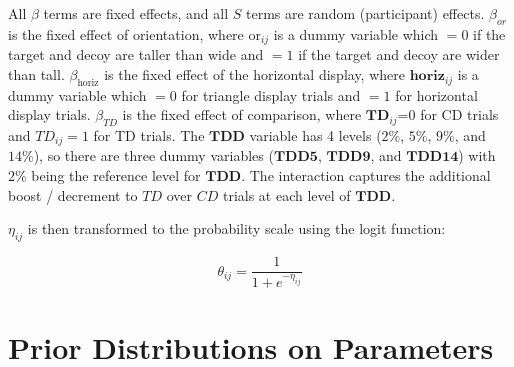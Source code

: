 All $\beta$ terms are fixed effects, and all $S$ terms are random (participant) effects. $\beta_{or}$ is the fixed effect of orientation, where $\text{or}_{ij}$ is a dummy variable which $=0$ if the target and decoy are taller than wide and $=1$ if the target and decoy are wider than tall. $\beta_{\mathrm{horiz}}$ is the fixed effect of the horizontal display, where $\bm{horiz}_{ij}$ is a dummy variable which $=0$ for triangle display trials and $=1$ for horizontal display trials. $\beta_{TD}$ is the fixed effect of comparison, where $\bm{TD}_{ij}$=0 for CD trials and $TD_{ij}=1$ for TD trials. The $\bm{TDD}$ variable has 4 levels ($2\%$, $5\%$, $9\%$, and $14\%$), so there are three dummy variables ($\bm{TDD5}$, $\bm{TDD9}$, and $\bm{TDD14}$) with $2\%$ being the reference level for $\bm{TDD}$. The interaction captures the additional boost / decrement to $TD$ over $CD$ trials at each level of $\bm{TDD}$. 

$\eta_{ij}$ is then transformed to the probability scale using the logit function:

\begin{equation}
    \theta_{ij}=\frac{1}{1+e^{-\eta_{ij}}}
\end{equation}

\section{Prior Distributions on Parameters}

